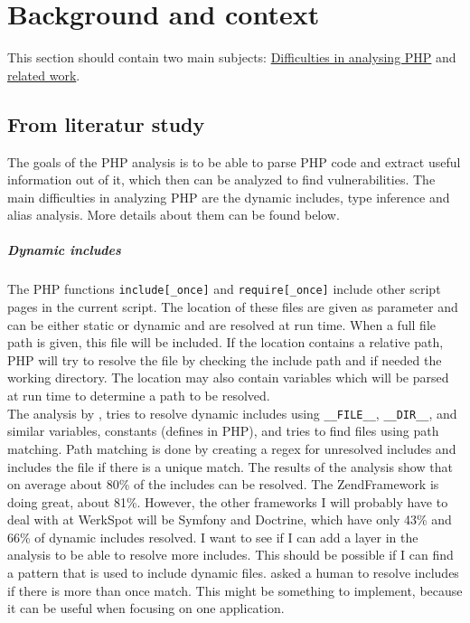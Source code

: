 \documentclass[../main.tex]{subfiles}
\begin{document}
    \chapter{Background and context}\label{chap:background}
    This section should contain two main subjects: \underline{Difficulties in analysing PHP} and \underline{related work}.
    \section{From literatur study}
    \label{phpdynamics}
The goals of the PHP analysis is to be able to parse PHP code and extract useful information out of it, which then can be analyzed to find vulnerabilities.
The main difficulties in analyzing PHP are the dynamic includes, type inference and alias analysis. 
More details about them can be found below.
\paragraph{Dynamic includes}
\label{includes}
The PHP functions \texttt{include[\_once]} and \texttt{require[\_once]} include other script pages in the current script.
The location of these files are given as parameter and can be either static or dynamic and are resolved at run time.
When a full file path is given, this file will be included.
If the location contains a relative path, PHP will try to resolve the file by checking the include path and if needed the working directory.
The location may also contain variables which will be parsed at run time to determine a path to be resolved.
\\
The analysis by  \autocite{Hil:12}, tries to resolve dynamic includes using \texttt{\_\_FILE\_\_}, \texttt{\_\_DIR\_\_}, and similar variables, constants (defines in PHP), and tries to find files using path matching.
Path matching is done by creating a regex for unresolved includes and includes the file if there is a unique match.
The results of the analysis show that on average about 80\% of the includes can be resolved.
The ZendFramework is doing great, about 81\%. However, the other frameworks I will probably have to deal with at WerkSpot will be Symfony and Doctrine, which have only 43\% and 66\% of dynamic includes resolved. 
I want to see if I can add a layer in the analysis to be able to resolve more includes. 
This should be possible if I can find a pattern that is used to include dynamic files.
 \autocite{Son:11} asked a human to resolve includes if there is more than once match.
This might be something to implement, because it can be useful when focusing on one application.
\end{document}
